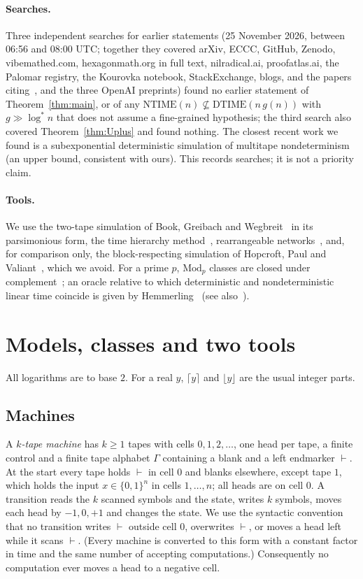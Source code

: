 \documentclass[11pt]{article}
\theoremstyle{definition}
\theoremstyle{remark}
\newcommand{\DTIME}{\mathrm{DTIME}}
\newcommand{\NTIME}{\mathrm{NTIME}}
\begin{document}
\paragraph{Searches.} Three independent searches for earlier statements (25 November 2026, between 06:56 and 08:00 UTC; together
they covered arXiv, ECCC, GitHub, Zenodo, vibemathed.com, hexagonmath.org in full text, nilradical.ai, proofatlas.ai, the Palomar
registry, the Kourovka notebook, StackExchange, blogs, and the papers citing~\cite{PPST}, \cite{San} and the three OpenAI preprints)
found no earlier statement of Theorem~\ref{thm:main}, or of any $\NTIME(n)\not\subseteq\DTIME(n\,g(n))$ with $g\gg\log^*n$ that
does not assume a fine-grained hypothesis; the third search also covered Theorem~\ref{thm:Uplus} and found nothing. The closest
recent work we found is a subexponential deterministic simulation of multitape nondeterminism~\cite{SS} (an upper bound, consistent
with ours). This records searches; it is not a priority claim.

\paragraph{Tools.} We use the two-tape simulation of Book, Greibach and Wegbreit~\cite{BGW} in its parsimonious form, the time
hierarchy method~\cite{HS65,Cook73,SFM78,Zak83}, rearrangeable networks~\cite{Benes,Waksman}, and, for comparison only, the
block-respecting simulation of Hopcroft, Paul and Valiant~\cite{HPV}, which we avoid. For a prime $p$, $\mathrm{Mod}_p$ classes
are closed under complement~\cite[Lemma 6.6]{BG}; an oracle relative to which deterministic and nondeterministic linear time
coincide is given by Hemmerling~\cite[Proposition 15]{Hem} (see also~\cite[Corollary 1]{Hem13}).

\section{Models, classes and two tools}\label{sec:models}

All logarithms are to base $2$. For a real $y$, $\lceil y\rceil$ and $\lfloor y\rfloor$ are the usual integer parts.

\subsection{Machines}
A \emph{$k$-tape machine} has $k\ge1$ tapes with cells $0,1,2,\dots$, one head per tape, a finite control and a finite tape
alphabet $\Gamma$ containing a blank and a left endmarker $\vdash$. At the start every tape holds $\vdash$ in cell $0$ and blanks
elsewhere, except tape $1$, which holds the input $x\in\{0,1\}^n$ in cells $1,\dots,n$; all heads are on cell $0$. A transition
reads the $k$ scanned symbols and the state, writes $k$ symbols, moves each head by $-1,0,+1$ and changes the state. We use the
syntactic convention that no transition writes $\vdash$ outside cell $0$, overwrites $\vdash$, or moves a head left while it
scans $\vdash$. (Every machine is converted to this form with a constant factor in time and the same number of accepting
computations.) Consequently no computation ever moves a head to a negative cell.
\end{document}
